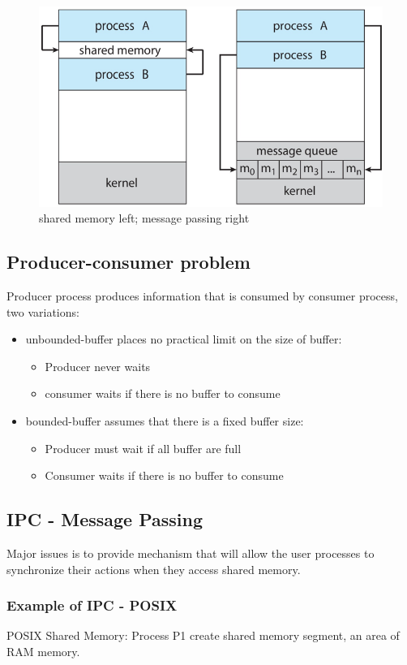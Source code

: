 \begin{figure}[htbp]
    \centering
    \includegraphics[width=0.5\linewidth]{img/IPC.png}
    \caption{shared memory left; message passing right}    
\end{figure}

\subsection{Producer-consumer problem}

Producer process produces information that is consumed by consumer process, two variations:

\begin{itemize}
    \item unbounded-buffer places no practical limit on the size of buffer:
    \begin{itemize}
        \item[] Producer never waits
        \item[] consumer waits if there is no buffer to consume
    \end{itemize}

    \item bounded-buffer assumes that there is a fixed buffer size:
    \begin{itemize}
        \item[] Producer must wait if all buffer are full
        \item[] Consumer waits if there is no buffer to consume
    \end{itemize}
\end{itemize}

 \subsection{IPC - Message Passing}
Major issues is to provide mechanism that will allow the user processes to synchronize their actions when they access shared memory.

\subsubsection{Example of IPC - POSIX}
POSIX Shared Memory: Process P1 create shared memory segment, an area of RAM memory.

